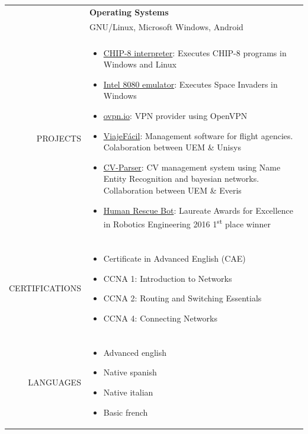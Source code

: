 \documentclass[a4paper, 11pt]{article}
\begin{document}
\begin{longtable}{rp{11cm}}
        & {\bf Operating Systems}\\
        & GNU/Linux, Microsoft Windows, Android\\
        \\
        PROJECTS
        & \vspace{-8mm}
        \begin{itemize}[leftmargin=0cm,label={}]
            \item \href{https://github.com/hugo19941994/CHIP8-Emu}{CHIP-8 interpreter}: Executes CHIP-8 programs in Windows and Linux
            \item \href{https://github.com/hugo19941994/SpaceInvaders-Emu}{Intel 8080 emulator}: Executes Space Invaders in Windows
            \item \href{https://ovpn.io}{ovpn.io}: VPN provider using OpenVPN
            \item \href{https://github.com/hugo19941994/ViajeFacil}{ViajeFácil}: Management software for flight agencies. Colaboration between UEM \& Unisys
            \item \href{https://github.com/hugo19941994/CV-Parser}{CV-Parser}: CV management system using Name Entity Recognition and bayesian networks. Collaboration between UEM \& Everis
            \item \href{https://github.com/hugo19941994/robot}{Human Rescue Bot}: Laureate Awards for Excellence in Robotics Engineering 2016 1\textsuperscript{st} place winner
        \end{itemize}\\
        \\
        CERTIFICATIONS
        & \vspace{-8mm}
        \begin{itemize}[leftmargin=0cm,label={},noitemsep]
            \item Certificate in Advanced English (CAE)
            \item CCNA 1: Introduction to Networks
            \item CCNA 2: Routing and Switching Essentials
            \item CCNA 4: Connecting Networks
        \end{itemize}\\
        \\
        LANGUAGES
        & \vspace{-8mm}
        \begin{itemize}[leftmargin=0cm,label={},noitemsep]
            \item Advanced english
            \item Native spanish
            \item Native italian
            \item Basic french
        \end{itemize}
    \end{longtable}
\end{document}

